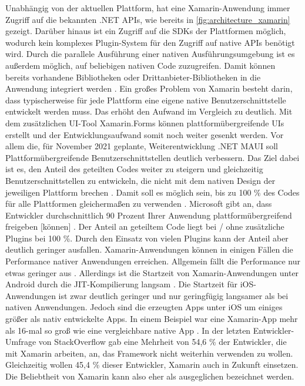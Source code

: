 Unabhängig von der aktuellen Plattform, hat eine Xamarin-Anwendung immer Zugriff auf die bekannten .NET \acp{API}, wie bereits in \autoref{fig:architecture_xamarin} gezeigt.
Darüber hinaus ist ein Zugriff auf die \acp{SDK} der Plattformen möglich, wodurch kein komplexes Plugin-System für den Zugriff auf native \acp{API} benötigt wird.
Durch die parallele Ausführung einer nativen Ausführungsumgebung ist es außerdem möglich, auf beliebigen nativen Code zuzugreifen.
Damit können bereits vorhandene Bibliotheken oder Drittanbieter-Bibliotheken in die Anwendung integriert werden \cite{Xamarin_Einfuehrung}.
\newline
Ein großes Problem von Xamarin besteht darin, dass typischerweise für jede Plattform eine eigene native Benutzerschnittstelle entwickelt werden muss.
Das erhöht den Aufwand im Vergleich zu  deutlich.
Mit dem zusätzlichen \ac{UI}-Tool Xamarin.Forms können plattformübergreifende \acp{UI} erstellt und der Entwicklungsaufwand somit noch weiter gesenkt werden.
Vor allem die, für November 2021 geplante, Weiterentwicklung .NET \ac{MAUI} soll Plattformübergreifende Benutzerschnittstellen deutlich verbessern.
Das Ziel dabei ist es, den Anteil des geteilten Codes weiter zu steigern und gleichzeitig Benutzerschnittstellen zu entwickeln, die nicht mit dem nativen Design der jeweiligen Plattform brechen \cite{NET_MAUI}.
Damit soll es möglich sein, bis zu 100 \% des Codes für alle Plattformen gleichermaßen zu verwenden \cite{Nawrocki_Comparison_Hybrid_Native_Frameworks, NET_MAUI, Bakker_Xamarin_XamarinForms_Native}.
Microsoft gibt an, dass \glqq Entwickler durchschnittlich 90 Prozent Ihrer Anwendung plattformübergreifend freigeben [können]\grqq{} \cite{Xamarin_Einfuehrung}.
Der Anteil an geteiltem Code liegt bei / ohne zusätzliche Plugins bei 100 \%.
Durch den Einsatz von vielen Plugins kann der Anteil aber deutlich geringer ausfallen.
\newline
\newline
Xamarin-Anwendungen können in einigen Fällen die Performance nativer Anwendungen erreichen.
Allgemein fällt die Performance nur etwas geringer aus \cite{Nawrocki_Comparison_Hybrid_Native_Frameworks, Bakker_Xamarin_XamarinForms_Native, Xamarin_Homepage}.
Allerdings ist die Startzeit von Xamarin-Anwendungen unter Android durch die \ac{JIT}-Kompilierung langsam \cite[S. 42]{Willocx_CrossPlatform_Performance}.
Die Startzeit für iOS-Anwendungen ist zwar deutlich geringer und nur geringfügig langsamer als bei nativen Anwendungen.
Jedoch sind die erzeugten Apps unter iOS um einiges größer als nativ entwickelte Apps.
In einem Beispiel war eine Xamarin-App mehr als 16-mal so groß wie eine vergleichbare native App \cite[S. 23ff.]{Nawrocki_Comparison_Hybrid_Native_Frameworks}.
\newline
In der letzten Entwickler-Umfrage von StackOverflow \cite{Stackoverflow_2022} gab eine Mehrheit von 54,6 \% der Entwickler, die mit Xamarin arbeiten, an, das Framework nicht weiterhin verwenden zu wollen.
Gleichzeitig wollen 45,4 \% dieser Entwickler, Xamarin auch in Zukunft einsetzen.
Die Beliebtheit von Xamarin kann also eher als ausgeglichen bezeichnet werden.